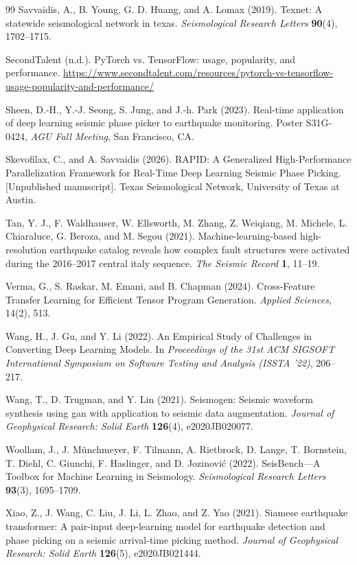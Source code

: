 \begin{thebibliography}{99}
Savvaidis, A., B. Young, G. D. Huang, and A. Lomax (2019). Texnet: A statewide seismological network in texas. \textit{Seismological Research Letters} \textbf{90}(4), 1702--1715.

SecondTalent (n.d.). PyTorch vs. TensorFlow: usage, popularity, and performance. \url{https://www.secondtalent.com/resources/pytorch-vs-tensorflow-usage-popularity-and-performance/}

Sheen, D.-H., Y.-J. Seong, S. Jung, and J.-h. Park (2023). Real-time application of deep learning seismic phase picker to earthquake monitoring. Poster S31G-0424, \textit{AGU Fall Meeting}, San Francisco, CA.

Skevofilax, C., and A. Savvaidis (2026). RAPID: A Generalized High-Performance Parallelization Framework for Real-Time Deep Learning Seismic Phase Picking. [Unpublished manuscript]. Texas Seismological Network, University of Texas at Austin.

Tan, Y. J., F. Waldhauser, W. Ellsworth, M. Zhang, Z. Weiqiang, M. Michele, L. Chiaraluce, G. Beroza, and M. Segou (2021). Machine-learning-based high-resolution earthquake catalog reveals how complex fault structures were activated during the 2016--2017 central italy sequence. \textit{The Seismic Record} \textbf{1}, 11--19.

Verma, G., S. Raskar, M. Emani, and B. Chapman (2024). Cross-Feature Transfer Learning for Efficient Tensor Program Generation. \textit{Applied Sciences}, 14(2), 513.

Wang, H., J. Gu, and Y. Li (2022). An Empirical Study of Challenges in Converting Deep Learning Models. In \textit{Proceedings of the 31st ACM SIGSOFT International Symposium on Software Testing and Analysis (ISSTA '22)}, 206--217.

Wang, T., D. Trugman, and Y. Lin (2021). Seismogen: Seismic waveform synthesis using gan with application to seismic data augmentation. \textit{Journal of Geophysical Research: Solid Earth} \textbf{126}(4), e2020JB020077.

Woollam, J., J. Münchmeyer, F. Tilmann, A. Rietbrock, D. Lange, T. Bornstein, T. Diehl, C. Giunchi, F. Haslinger, and D. Jozinović (2022). SeisBench---A Toolbox for Machine Learning in Seismology. \textit{Seismological Research Letters} \textbf{93}(3), 1695--1709.

Xiao, Z., J. Wang, C. Liu, J. Li, L. Zhao, and Z. Yao (2021). Siamese earthquake transformer: A pair-input deep-learning model for earthquake detection and phase picking on a seismic arrival-time picking method. \textit{Journal of Geophysical Research: Solid Earth} \textbf{126}(5), e2020JB021444.


\end{thebibliography}
